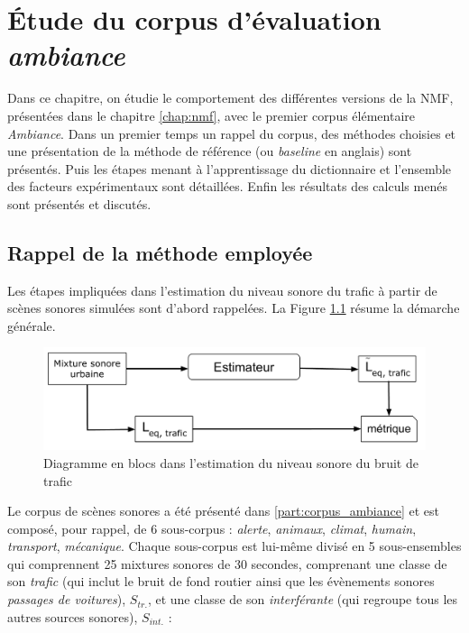 
\chapter{\'Etude du corpus d'évaluation \textit{ambiance}}
\label{chap:ambiance}
Dans ce chapitre, on étudie le comportement des différentes versions de la NMF, présentées dans le chapitre \ref{chap:nmf},  avec le premier corpus élémentaire \textit{Ambiance}. 
Dans un premier temps un rappel du corpus, des méthodes choisies et une présentation de la méthode de référence (ou \textit{baseline} en anglais) sont présentés. Puis les étapes menant à l'apprentissage du dictionnaire et l'ensemble des facteurs expérimentaux sont détaillées. Enfin les résultats des calculs menés sont présentés et discutés.


\section{Rappel de la méthode employée}

Les étapes impliquées dans l'estimation du niveau sonore du trafic à partir de scènes sonores simulées sont d'abord rappelées. La Figure \ref{fig:rappel_estimateur} résume la démarche générale.

\begin{figure}[ht]
\centering
\includegraphics[width=.8\linewidth]{./figures/NMF/Bloc_diagram_estimateur_FR.pdf}
\caption{Diagramme en blocs dans l'estimation du niveau sonore du bruit de trafic}
\label{fig:rappel_estimateur}
\end{figure}

Le corpus de scènes sonores a été présenté dans \ref{part:corpus_ambiance} et est composé, pour rappel, de 6 sous-corpus : \textit{alerte}, \textit{animaux}, \textit{climat}, \textit{humain}, \textit{transport}, \textit{mécanique}. Chaque sous-corpus est lui-même divisé en 5 sous-ensembles qui comprennent 25 mixtures sonores de 30 secondes, comprenant une classe de son \textit{trafic} (qui inclut le bruit de fond routier ainsi que les évènements sonores \textit{passages de voitures}), $S_{tr.}$, et une classe de son \textit{interférante} (qui regroupe tous les autres sources sonores), $S_{int.}$ : 

